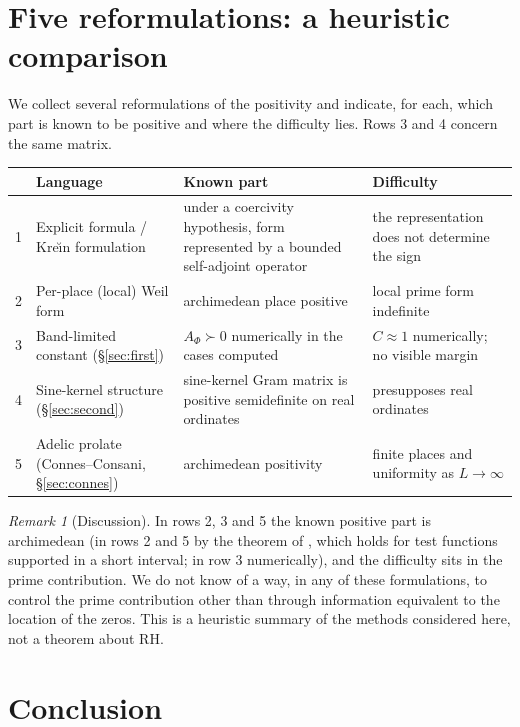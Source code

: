 \documentclass[11pt]{amsart}
\theoremstyle{definition}
\theoremstyle{remark}
\newtheorem{remark}[theorem]{Remark}
\newcommand{\Cband}{C}
\newcommand{\Aphi}{A_\Phi}
\begin{document}
\section{Five reformulations: a heuristic comparison}\label{sec:map}

We collect several reformulations of the positivity and indicate, for each, which part is known to be positive
and where the difficulty lies. Rows 3 and 4 concern the same matrix.

\begin{center}
\renewcommand{\arraystretch}{1.25}
\begin{tabular}{p{0.5cm}p{4.5cm}p{4.3cm}p{3.6cm}}
\toprule
 & \textbf{Language} & \textbf{Known part} & \textbf{Difficulty}\\
\midrule
1 & Explicit formula / Kre\u{\i}n formulation \cite{Pkrein} & under a coercivity hypothesis, form represented by a bounded self-adjoint operator \cite{Pkrein} & the representation does not determine the sign\\
2 & Per-place (local) Weil form & archimedean place positive \cite{CC2021} & local prime form indefinite \cite{Panatomy}\\
3 & Band-limited constant (\S\ref{sec:first}) & $\Aphi\succ0$ numerically in the cases computed & $\Cband\approx1$ numerically; no visible margin\\
4 & Sine-kernel structure (\S\ref{sec:second}) & sine-kernel Gram matrix is positive semidefinite on real ordinates & presupposes real ordinates\\
5 & Adelic prolate (Connes--Consani, \S\ref{sec:connes}) & archimedean positivity \cite{CC2021} & finite places and uniformity as $L\to\infty$\\
\bottomrule
\end{tabular}
\end{center}

\begin{remark}[Discussion]\label{thm:wall}
In rows 2, 3 and 5 the known positive part is archimedean (in rows 2 and 5 by the theorem of \cite{CC2021}, which holds for test functions supported in a short interval; in row 3 numerically), and the difficulty sits
in the prime contribution. We do not know of a way, in any of these formulations, to control the prime
contribution other than through information equivalent to the location of the zeros. This is a heuristic
summary of the methods considered here, not a theorem about RH.
\end{remark}

\section{Conclusion}\label{sec:concl}
\end{document}
